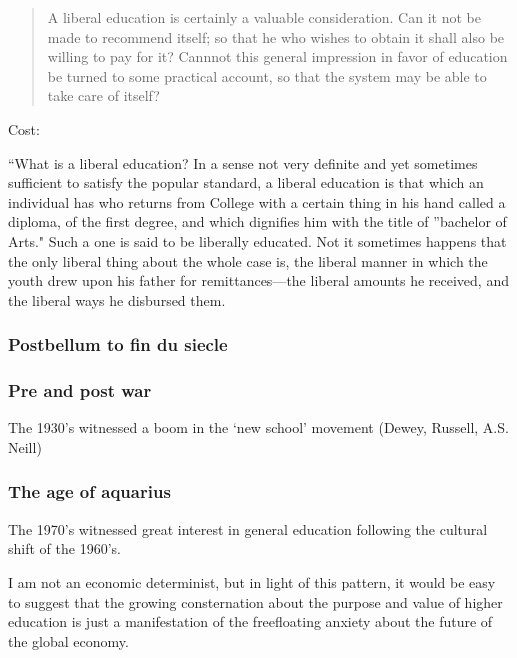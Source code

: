 \begin{quote}

A liberal education is certainly a valuable consideration. Can it not be made to recommend itself; so that he who wishes to obtain it shall also be willing to pay for it? Cannnot this general impression in favor of education be turned to some practical account, so that the system may be able to take care of itself? ~\citep[p.17]{Wayland:1842tw}
\end{quote}

Cost:

``What is a liberal education? In a sense not very definite and yet sometimes sufficient to satisfy the popular standard, a liberal education is that which an individual has who returns from College with a certain thing in his hand called a diploma, of the first degree, and which dignifies him with the title of ''bachelor of Arts." Such a one is said to be liberally educated. Not it sometimes happens that the only liberal thing about the whole case is, the liberal manner in which the youth drew upon his father for remittances---the liberal amounts he received, and the liberal ways he disbursed them.~\citep[p. 192]{Biggs:1841uc}

\subsubsection{Postbellum to fin du siecle}
\label{postbellumtofindusiecle}

\subsubsection{Pre and post war}
\label{preandpostwar}

The 1930's witnessed a boom in the `new school' movement (Dewey, Russell, A.S. Neill)

\subsubsection{The age of aquarius}
\label{theageofaquarius}

The 1970's witnessed great interest in general education following the cultural shift of the 1960's. 

I am not an economic determinist, but in light of this pattern, it would be easy to suggest that the growing consternation about the purpose and value of higher education is just a manifestation of the freefloating anxiety about the future of the global economy.

